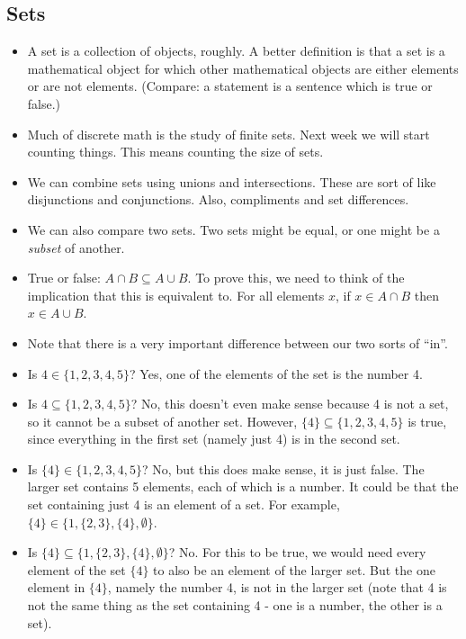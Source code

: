 \documentclass[12pt]{article}
\theoremstyle{plain}
\theoremstyle{definition}
\theoremstyle{remark}
\begin{document}
\subsection*{Sets}

\begin{itemize}
\item A set is a collection of objects, roughly.  A better definition is that a set is a mathematical object for which other mathematical objects are either elements or are not elements.  (Compare: a statement is a sentence which is true or false.)

\item Much of discrete math is the study of finite sets.  Next week we will start counting things.  This means counting the size of sets.

\item We can combine sets using unions and intersections.  These are sort of like disjunctions and conjunctions.  Also, compliments and set differences.

\item We can also compare two sets.  Two sets might be equal, or one might be a \emph{subset} of another.

\item True or false: $A \cap B \subseteq A \cup B$.  To prove this, we need to think of the implication that this is equivalent to.  For all elements $x$, if $x \in A \cap B$ then $x \in A \cup B$.

\item Note that there is a very important difference between our two sorts of ``in''.

\item Is $4 \in \{1,2,3,4,5\}$?  Yes, one of the elements of the set is the number 4.
\item Is $4 \subseteq \{1,2,3,4,5\}$?  No, this doesn't even make sense because 4 is not a set, so it cannot be a subset of another set.  However, $\{4\} \subseteq \{1,2,3,4,5\}$ is true, since everything in the first set (namely just 4) is in the second set.
\item Is $\{4\} \in \{1,2,3,4,5\}$?  No, but this does make sense, it is just false.  The larger set contains 5 elements, each of which is a number.  It could be that the set containing just 4 is an element of a set.  For example, $\{4\} \in \{1,\{2,3\}, \{4\}, \emptyset\}$.

\item Is $\{4\} \subseteq \{1, \{2,3\}, \{4\}, \emptyset\}$?  No.  For this to be true, we would need every element of the set $\{4\}$ to also be an element of the larger set.  But the one element in $\{4\}$, namely the number 4, is not in the larger set (note that 4 is not the same thing as the set containing 4 - one is a number, the other is a set).


\end{itemize}
\end{document}
